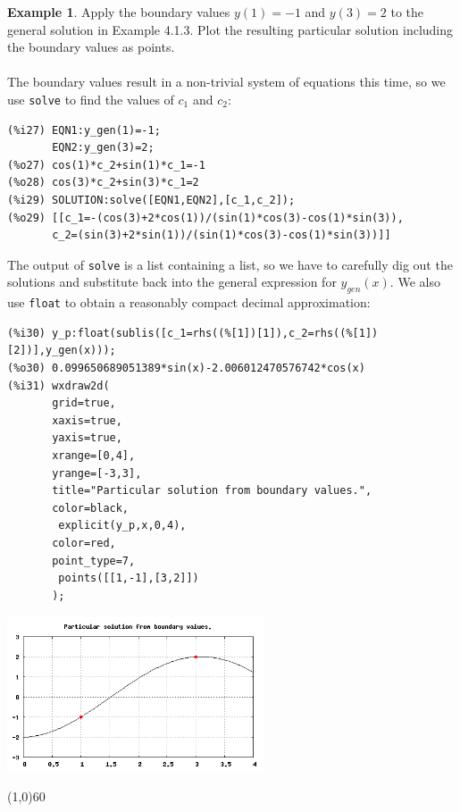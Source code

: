 \documentclass[10.5pt,twoside]{report}
\theoremstyle{definition}
\newtheorem{exmp}{Example}[section]
\begin{document}
\begin{exmp} Apply the boundary values $y(1)=-1$ and $y(3)=2$ to the general solution in Example 4.1.3.  Plot the resulting particular solution including the boundary values as points.\\

${}$\\

The boundary values result in a non-trivial system of equations this time, so we use \verb|solve| to find the values of $c_1$ and $c_2$:

\begin{verbatim}
(%i27) EQN1:y_gen(1)=-1;
       EQN2:y_gen(3)=2;
(%o27) cos(1)*c_2+sin(1)*c_1=-1
(%o28) cos(3)*c_2+sin(3)*c_1=2
(%i29) SOLUTION:solve([EQN1,EQN2],[c_1,c_2]);
(%o29) [[c_1=-(cos(3)+2*cos(1))/(sin(1)*cos(3)-cos(1)*sin(3)),
       c_2=(sin(3)+2*sin(1))/(sin(1)*cos(3)-cos(1)*sin(3))]]
\end{verbatim}

The output of \verb|solve| is a list containing a list, so we have to carefully dig out the solutions and substitute back into the general expression for $y_{gen}(x)$.  We also use \verb|float| to obtain a reasonably compact decimal approximation:

\begin{verbatim}       
(%i30) y_p:float(sublis([c_1=rhs((%[1])[1]),c_2=rhs((%[1])[2])],y_gen(x)));
(%o30) 0.099650689051389*sin(x)-2.006012470576742*cos(x)
(%i31) wxdraw2d(
       grid=true,
       xaxis=true,
       yaxis=true,
       xrange=[0,4],
       yrange=[-3,3],
       title="Particular solution from boundary values.",
       color=black,
        explicit(y_p,x,0,4),
       color=red,
       point_type=7,
        points([[1,-1],[3,2]])
       );
\end{verbatim}

\includegraphics[width=3in]{example_4_1_5_1}

\end{exmp}

\line(1,0){60}
\linethickness{0.5mm}
\pagebreak
\end{document}
